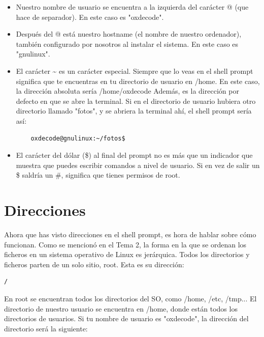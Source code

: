 \begin{itemize}
    \item Nuestro nombre de usuario se encuentra a la izquierda del carácter @ (que hace de separador). En este caso es "oxdecode".
    \item Después del @ está nuestro hostname (el nombre de nuestro ordenador), también configurado por nosotros al instalar el sistema. En este caso es "gnulinux".
    \item El carácter \~{} es un carácter especial. Siempre que lo veas en el shell prompt significa que te encuentras en tu directorio de usuario en /home. En este caso, la dirección absoluta sería /home/oxdecode Además, es la dirección por defecto en que se abre la terminal. Si en el directorio de usuario hubiera otro directorio llamado "fotos", y se abriera la terminal ahí, el shell prompt sería así:

    \begin{tcolorbox-code}
\begin{lstlisting}
    oxdecode@gnulinux:~/fotos$
\end{lstlisting}
\end{tcolorbox-code}

    \item El carácter del dólar (\$) al final del prompt no es más que un indicador que muestra que puedes escribir comandos a nivel de usuario. Si en vez de salir un \$ saldría un \#, significa que tienes permisos de root.
\end{itemize}

\section{Direcciones}
Ahora que has visto direcciones en el shell prompt, es hora de hablar sobre cómo funcionan. Como se mencionó en el Tema 2, la forma en la que se ordenan los ficheros en un sistema operativo de Linux es jerárquica. Todos los directorios y ficheros parten de un solo sitio, root. Esta es su dirección:

\begin{tcolorbox-code}
\begin{lstlisting}
/
\end{lstlisting}
\end{tcolorbox-code}

En root se encuentran todos los directorios del SO, como /home, /etc, /tmp... El directorio de nuestro usuario se encuentra en /home, donde están todos los directorios de usuarios. Si tu nombre de usuario es "oxdecode", la dirección del directorio será la siguiente:

